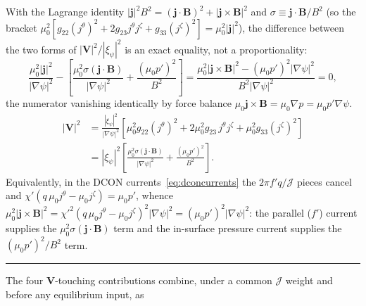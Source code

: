 \documentclass[10pt,a4paper]{article}
\numberwithin{equation}{section}
\begin{document}
With the Lagrange identity
$|\mathbf j|^2B^2=(\mathbf j\cdot\mathbf B)^2+|\mathbf j\times\mathbf B|^2$ and
$\sigma\equiv\mathbf j\cdot\mathbf B/B^2$ (so the bracket
$\mu_0^2[g_{22}(j^\theta)^2+2g_{23}j^\theta j^\zeta+g_{33}(j^\zeta)^2]=\mu_0^2|\mathbf j|^2$),
the difference between the two forms of $|\mathbf V|^2/|\xi_\psi|^2$ is an exact
equality, not a proportionality:
\begin{equation}
\frac{\mu_0^2|\mathbf j|^2}{|\nabla\psi|^2}
-\left[\frac{\mu_0^2\sigma(\mathbf j\cdot\mathbf B)}{|\nabla\psi|^2}
+\frac{(\mu_0p')^2}{B^2}\right]
=\frac{\mu_0^2|\mathbf j\times\mathbf B|^2-(\mu_0p')^2|\nabla\psi|^2}
       {B^2|\nabla\psi|^2}
=0 ,
\end{equation}
the numerator vanishing identically by force balance
$\mu_0\mathbf j\times\mathbf B=\mu_0\nabla p=\mu_0 p'\nabla\psi$. 
\begin{equation}
\begin{aligned}
|\mathbf V|^2
&=
\frac{|\xi_\psi|^2}{|\nabla\psi|^2}
\left[
\mu_0^2 g_{22}(j^\theta)^2
+2\mu_0^2 g_{23}\,j^\theta j^\zeta
+\mu_0^2 g_{33}(j^\zeta)^2
\right] \\
&=
|\xi_\psi|^2
\left[
\frac{\mu_0^2\sigma(\mathbf j\cdot\mathbf B)}{|\nabla\psi|^2}
+\frac{(\mu_0p')^2}{B^2}
\right].
\end{aligned}
\end{equation}
Equivalently, in
the DCON currents~\eqref{eq:dconcurrents} the $2\pi f'q/\mathcal J$ pieces
cancel and $\chi'(q\,\mu_0 j^\theta-\mu_0 j^\zeta)=\mu_0p'$, whence
$\mu_0^2|\mathbf j\times\mathbf B|^2
=\chi'^2(q\,\mu_0 j^\theta-\mu_0 j^\zeta)^2|\nabla\psi|^2=(\mu_0p')^2|\nabla\psi|^2$:
the parallel ($f'$) current supplies the
$\mu_0^2\sigma(\mathbf j\cdot\mathbf B)$ term and the in-surface pressure
current supplies the $(\mu_0p')^2/B^2$ term.

\medskip
\noindent\rule{\linewidth}{0.4pt}
\medskip

The four $\mathbf V$-touching contributions combine, under a common
$\mathcal J$ weight and before any equilibrium input, as
\end{document}
